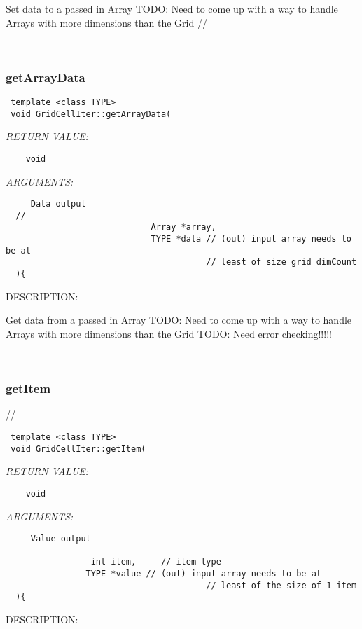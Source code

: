    Set data to a passed in Array
   TODO: Need to come up with a way to handle Arrays with more dimensions than the Grid
  // 
 
\mbox{}\hrulefill\
 
\subsubsection [getArrayData] {getArrayData}


  
\begin{verbatim} template <class TYPE>
 void GridCellIter::getArrayData(\end{verbatim}{\em RETURN VALUE:}
\begin{verbatim}    void\end{verbatim}{\em ARGUMENTS:}
\begin{verbatim}     Data output
  // 
                             Array *array,
                             TYPE *data // (out) input array needs to be at
                                        // least of size grid dimCount    
  ){\end{verbatim}
{\sf DESCRIPTION:\\ }


   Get data from a passed in Array
   TODO: Need to come up with a way to handle Arrays with more dimensions than the Grid
   TODO: Need error checking!!!!!
   
 
\mbox{}\hrulefill\
 
\subsubsection [getItem] {getItem}


  //
\begin{verbatim} template <class TYPE>
 void GridCellIter::getItem(\end{verbatim}{\em RETURN VALUE:}
\begin{verbatim}    void\end{verbatim}{\em ARGUMENTS:}
\begin{verbatim}     Value output 
   
                 int item,     // item type
                TYPE *value // (out) input array needs to be at
                                        // least of the size of 1 item    
  ){\end{verbatim}
{\sf DESCRIPTION:\\ }


